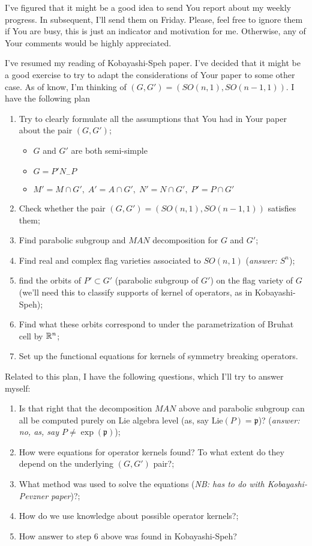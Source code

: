\documentclass[12pt]{article} %
\begin{document}
I've figured that it might be a good idea to send You report about my weekly progress. In subsequent, I'll send them on Friday.
 Please, feel free to ignore them if You are busy, this is just an indicator and motivation for me. Otherwise, any of Your comments would be 
highly appreciated.

I've resumed my reading of Kobayashi-Speh paper. I've decided that it might be a good exercise to try to adapt the considerations of Your paper
to some other case. As of know, I'm thinking of $(G,G')=(SO(n,1),SO(n-1,1))$. I have the following plan 
\begin{enumerate}
\item Try to clearly formulate all the assumptions that You had in Your paper about the pair $(G,G')$;
\begin{itemize}
\item $G$ and $G'$ are both semi-simple
\item $G=P'N_-P$
\item $M'=M\cap G',\;A'=A\cap G',\;N'=N\cap G',\;P'=P\cap G'$ %
\end{itemize}
\item Check whether the pair $(G,G')=(SO(n,1),SO(n-1,1))$ satisfies them;
\item Find parabolic subgroup and $MAN$ decomposition for $G$ and $G'$;
\item Find real and complex flag varieties associated to $SO(n,1)$ (\textit{answer: $S^n$});
\item find the orbits of $P'\subset G'$ (parabolic subgroup of $G'$) on the flag variety of $G$ (we'll need this to classify
supports of kernel of operators, as in Kobayashi-Speh);
\item Find what these orbits correspond to under the parametrization of Bruhat cell by $\mathbb{R}^n$;
\item Set up the functional equations for kernels of symmetry breaking operators.
\end{enumerate}
Related to this plan, I have the following questions, which I'll try to answer myself:
\begin{enumerate}
\item Is that right that the decomposition $MAN$ above and parabolic subgroup can all be computed purely on Lie algebra level (as, say
 $\mbox{Lie}(P)=\mathfrak{p}$)? (\textit{answer: no, as, say $P\neq\exp(\mathfrak{p})$});
\item How were equations for operator kernels found? To what extent do they depend on the underlying $(G,G')$ pair?;
\item What method was used to solve the equations (\textit{NB: has to do with Kobayashi-Pevzner paper})?;
\item How do we use knowledge about possible operator kernels?;
\item How answer to step 6 above was found in Kobayashi-Speh?
\end{enumerate}
\end{document}
